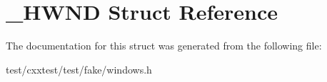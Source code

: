 \hypertarget{struct__HWND}{\section{\-\_\-\-H\-W\-N\-D Struct Reference}
\label{struct__HWND}
}


The documentation for this struct was generated from the following file\-:\begin{DoxyCompactItemize}
\item 
test/cxxtest/test/fake/windows.\-h\end{DoxyCompactItemize}
